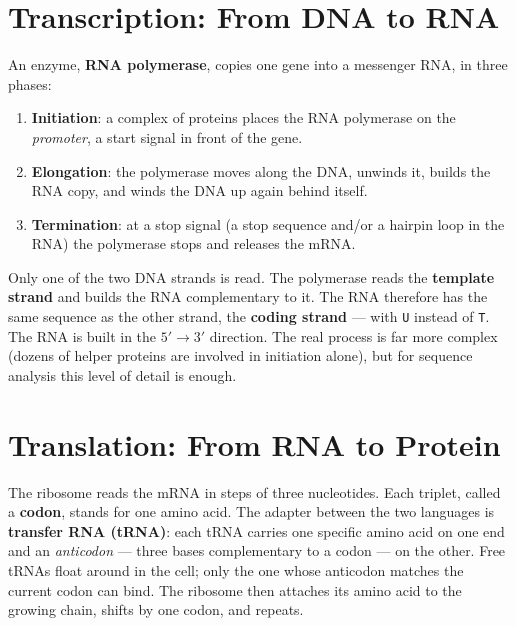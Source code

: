\documentclass[11pt, oneside]{book}
\newcommand{\seq}[1]{\texttt{#1}}
\let\originalsection\section
\renewcommand{\section}{\Needspace{7\baselineskip}\originalsection}
\begin{document}
\section{Transcription: From DNA to RNA}
\label{sec:transcription}

\begin{defbox}[title={Transcription}]
An enzyme, \textbf{RNA polymerase}, copies one gene into a messenger RNA,
in three phases:
\begin{enumerate}
  \item \textbf{Initiation}: a complex of proteins places the RNA polymerase
    on the \emph{promoter}, a start signal in front of the gene.
  \item \textbf{Elongation}: the polymerase moves along the DNA, unwinds it,
    builds the RNA copy, and winds the DNA up again behind itself.
  \item \textbf{Termination}: at a stop signal (a stop sequence and/or a
    hairpin loop in the RNA) the polymerase stops and releases the mRNA.
\end{enumerate}
\end{defbox}

Only one of the two DNA strands is read. The polymerase reads the
\textbf{template strand} and builds the RNA complementary to it. The RNA
therefore has the same sequence as the other strand, the \textbf{coding
strand} --- with \seq{U} instead of \seq{T}. The RNA is built in the
$5' \to 3'$ direction. The real process is far more complex (dozens of
helper proteins are involved in initiation alone), but for sequence analysis
this level of detail is enough.

\section{Translation: From RNA to Protein}
\label{sec:translation}

The ribosome reads the mRNA in steps of three nucleotides. Each triplet,
called a \textbf{codon}, stands for one amino acid. The adapter between the
two languages is \textbf{transfer RNA (tRNA)}: each tRNA carries one specific
amino acid on one end and an \emph{anticodon} --- three bases complementary
to a codon --- on the other. Free tRNAs float around in the cell; only the one
whose anticodon matches the current codon can bind. The ribosome then attaches
its amino acid to the growing chain, shifts by one codon, and repeats.
\end{document}
